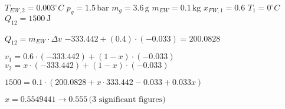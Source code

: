 \( T_{EW,2} = 0.003^\circ C \)  
\( p_{g} = 1.5 \, \text{bar} \)  
\( m_{g} = 3.6 \, \text{g} \)  
\( m_{EW} = 0.1 \, \text{kg} \)  
\( x_{FW,1} = 0.6 \)  
\( T_{1} = 0^\circ C \)  
\( Q_{12} = 1500 \, \text{J} \)  

\( Q_{12} = m_{EW} \cdot \Delta v \)  
\( -333.442 + (0.4) \cdot (-0.033) = 200.0828 \)  

\( v_{1} = 0.6 \cdot (-333.442) + (1 - x) \cdot (-0.033) \)  
\( v_{2} = x \cdot (-333.442) + (1 - x) \cdot (-0.033) \)  

\( 1500 = 0.1 \cdot (200.0828 + x \cdot 333.442 - 0.033 + 0.033x) \)  

\( x = 0.5549441 \rightarrow 0.555 \, \text{(3 significant figures)} \)